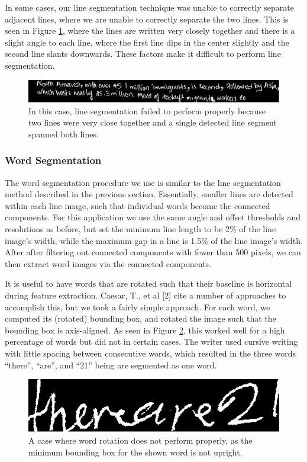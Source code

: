 \documentclass[paper=a4, fontsize=11pt]{scrartcl} %
\numberwithin{equation}{section} %
\numberwithin{figure}{section} %
\numberwithin{table}{section} %
\begin{document}
In some cases, our line segmentation technique was unable to correctly separate adjacent lines, where we are unable to correctly separate the two lines. This is seen in Figure \ref{fig:linefail}, where the lines are written very closely together and there is a slight angle to each line, where the first line dips in the center slightly and the second line slants downwards. These factors make it difficult to perform line segmentation.

\begin{figure}
\includegraphics{linefail.png}
\caption{In this case, line segmentation failed to perform properly because two lines were very close together and a single detected line segment spanned both lines.}
\label{fig:linefail}
\end{figure}

\subsubsection{Word Segmentation}
The word segmentation procedure we use is similar to the line
segmentation method described in the previous section. Essentially,
smaller lines are detected within each line image, such that
individual words become the connected components. For this application
we use the same angle and offset thresholds and resolutions as before,
but set the minimum line length to be 2\% of the line image’s width,
while the maximum gap in a line is 1.5\% of the line image’s
width. After after filtering out connected components with fewer than
500 pixels, we can then extract word images via the connected
components.

It is useful to have words that are rotated such that their baseline is horizontal during feature extraction. Caesar, T., et al [2] cite a number of approaches to accomplish this, but we took a fairly simple approach. For each word, we computed its (rotated) bounding box, and rotated the image such that the bounding box is axis-aligned. As seen in Figure \ref{fig:wordfail}, this worked well for a high percentage of words but did not in certain cases. The writer used cursive writing with little spacing between consecutive words, which resulted in the three words “there”, “are”, and “21” being are segmented as one word.

\begin{figure}
  \includegraphics{wordfail.png}
  \caption{A case where word rotation does not perform properly, as
    the minimum bounding box for the shown word is not upright.}
  \label{fig:wordfail}
\end{figure}
\end{document}
